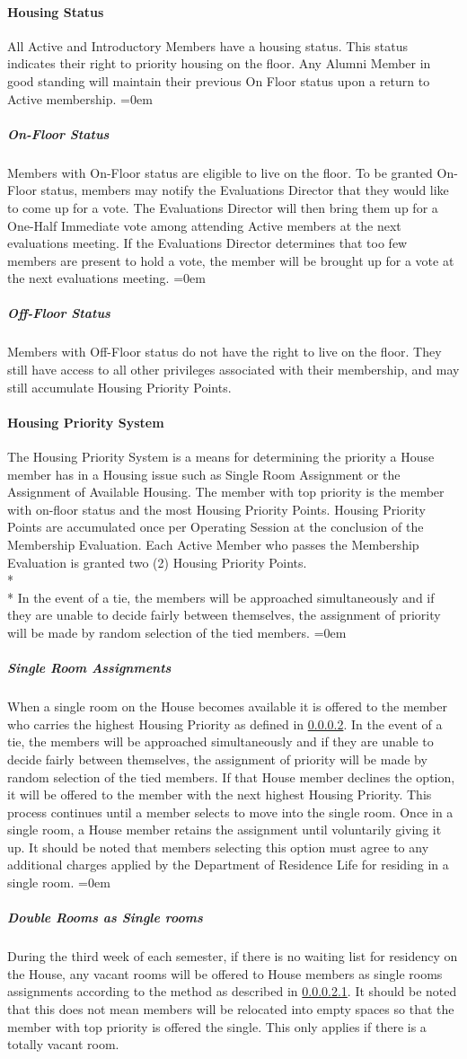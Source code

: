 \documentclass{article}
\newcommand{\asubsubsection}[1]{\paragraph{#1} \label{#1}}
\newcommand{\asubsubsubsection}[1]{\parindent=0em\subparagraph{#1} \label{#1}}
\begin{document}
\asubsubsection{Housing Status}
All Active and Introductory Members have a housing status.
This status indicates their right to priority housing on the floor.
Any Alumni Member in good standing will maintain their previous On Floor status upon a return to Active membership.
\asubsubsubsection{On-Floor Status}
Members with On-Floor status are eligible to live on the floor.
To be granted On-Floor status, members may notify the Evaluations Director that they would like to come up for a vote.
The Evaluations Director will then bring them up for a One-Half Immediate vote among attending Active members at the next evaluations meeting.
If the Evaluations Director determines that too few members are present to hold a vote, the member will be brought up for a vote at the next evaluations meeting.
\asubsubsubsection{Off-Floor Status}
Members with Off-Floor status do not have the right to live on the floor.
They still have access to all other privileges associated with their membership, and may still accumulate Housing Priority Points.

\asubsubsection{Housing Priority System}
The Housing Priority System is a means for determining the priority a House member has in a Housing issue such as Single Room Assignment or the Assignment of Available Housing.
The member with top priority is the member with on-floor status and the most Housing Priority Points.
Housing Priority Points are accumulated once per Operating Session at the conclusion of the Membership Evaluation. Each Active Member who passes the Membership Evaluation is granted two (2) Housing Priority Points.
\\* \\*
In the event of a tie, the members will be approached simultaneously and if they are unable to decide fairly between themselves, the assignment of priority will be made by random selection of the tied members.
\asubsubsubsection{Single Room Assignments}
When a single room on the House becomes available it is offered to the member who carries the highest Housing Priority as defined in \ref{Housing Priority System}.
In the event of a tie, the members will be approached simultaneously and if they are unable to decide fairly between themselves, the assignment of priority will be made by random selection of the tied members.
If that House member declines the option, it will be offered to the member with the next highest Housing Priority.
This process continues until a member selects to move into the single room.
Once in a single room, a House member retains the assignment until voluntarily giving it up.
It should be noted that members selecting this option must agree to any additional charges applied by the Department of Residence Life for residing in a single room.
\asubsubsubsection{Double Rooms as Single rooms}
During the third week of each semester, if there is no waiting list for residency on the House, any vacant rooms will be offered to House members as single rooms assignments according to the method as described in \ref{Single Room Assignments}.
It should be noted that this does not mean members will be relocated into empty spaces so that the member with top priority is offered the single.
This only applies if there is a totally vacant room.
\end{document}
